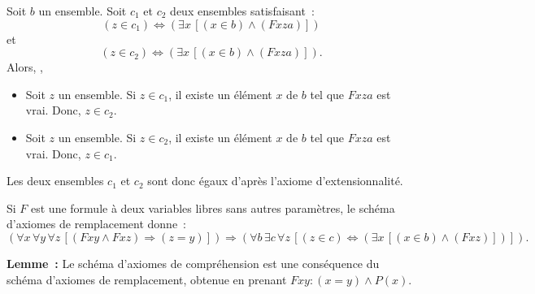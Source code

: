     Soit $b$ un ensemble. 
    Soit $c_1$ et $c_2$ deux ensembles satisfaisant : 
    \begin{equation*}
        (z \in c_1) \Leftrightarrow (\exists x \, [(x \in b) \wedge (F x z a)])
    \end{equation*}
    et 
    \begin{equation*}
        (z \in c_2) \Leftrightarrow (\exists x \, [(x \in b) \wedge (F x z a)]) .
    \end{equation*}
    Alors, ,
    \begin{itemize}[nosep]
        \item Soit $z$ un ensemble. 
            Si $z \in c_1$, il existe un élément $x$ de $b$ tel que $F x z a$ est vrai. 
            Donc, $z \in c_2$.
        \item Soit $z$ un ensemble. 
            Si $z \in c_2$, il existe un élément $x$ de $b$ tel que $F x z a$ est vrai. 
            Donc, $z \in c_1$.
    \end{itemize}
    Les deux ensembles $c_1$ et $c_2$ sont donc égaux d'après l'axiome d'extensionnalité.

   \done 

\medskip

Si $F$ est une formule à deux variables libres sans autres paramètres, le schéma d'axiomes de remplacement donne :
\begin{equation*}
    \left( 
        \forall x \, \forall y \, \forall z \, \left[
            (F x y \wedge F x z) \Rightarrow (z = y)
        \right]
    \right)
    \Rightarrow
    \left(
        \forall b \, \exists c \, \forall z \, \left[
            (z \in c) \Leftrightarrow (\exists x \, [(x \in b) \wedge (F x z)])
        \right]
    \right)
.
\end{equation*}

\medskip

\noindent\textbf{Lemme :} Le schéma d'axiomes de compréhension est une conséquence du schéma d'axiomes de remplacement, obtenue en prenant $F x y : (x = y) \wedge P(x)$. 

\medskip

